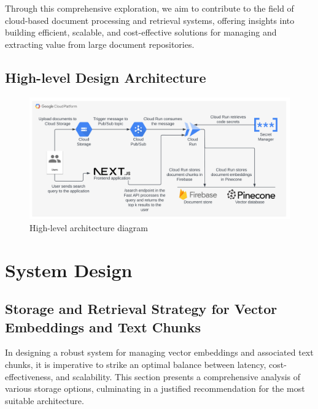 \documentclass[a4paper, 12pt]{report}
\begin{document}
Through this comprehensive exploration, we aim to contribute to the field of cloud-based document processing and retrieval systems, offering insights into building efficient, scalable, and cost-effective solutions for managing and extracting value from large document repositories.

\clearpage
\section{High-level Design Architecture}

\begin{figure}[htbp]
    \centering
    \includegraphics[width=\textwidth,angle=90]{high-level-architecture.png}
    \caption{High-level architecture diagram}
    \label{fig:high-level-architecture}
\end{figure}



\chapter{System Design}

\section{Storage and Retrieval Strategy for Vector Embeddings and Text Chunks}
In designing a robust system for managing vector embeddings and associated text chunks, it is imperative to strike an optimal balance between latency, cost-effectiveness, and scalability. This section presents a comprehensive analysis of various storage options, culminating in a justified recommendation for the most suitable architecture.
\end{document}
